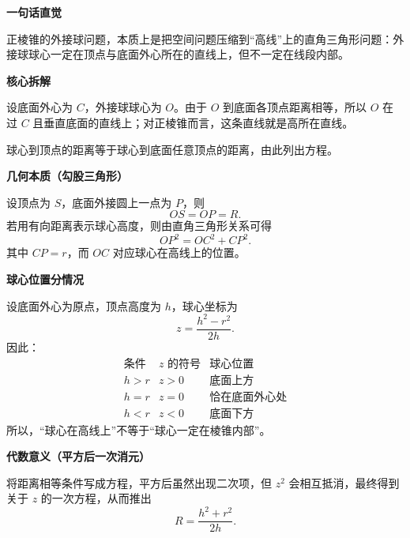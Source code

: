 \begin{explanationbox}

	\textbf{\textcolor{CExplanation}{一句话直觉}}

	正棱锥的外接球问题，本质上是把空间问题压缩到“高线”上的直角三角形问题：外接球球心一定在顶点与底面外心所在的直线上，但不一定在线段内部。

	\medskip
	\textbf{\textcolor{CExplanation}{核心拆解}}
	\begin{description}[style=nextline, leftmargin=2.8em, labelsep=0.5em, itemsep=0.45em]
		\item[\textbf{要点一（球心位置）：}] 设底面外心为 $C$，外接球球心为 $O$。由于 $O$ 到底面各顶点距离相等，所以 $O$ 在过 $C$ 且垂直底面的直线上；对正棱锥而言，这条直线就是高所在直线。
		\item[\textbf{要点二（距离相等）：}] 球心到顶点的距离等于球心到底面任意顶点的距离，由此列出方程。
	\end{description}

	\medskip
	\textbf{\textcolor{CExplanation}{几何本质（勾股三角形）}}

	设顶点为 $S$，底面外接圆上一点为 $P$，则
	\[
		OS=OP=R.
	\]
	若用有向距离表示球心高度，则由直角三角形关系可得
	\[
		OP^2 = OC^2 + CP^2.
	\]
	其中 $CP=r$，而 $OC$ 对应球心在高线上的位置。

	\medskip
	\textbf{\textcolor{CExplanation}{球心位置分情况}}

	设底面外心为原点，顶点高度为 $h$，球心坐标为
	\[
		z=\frac{h^2-r^2}{2h}.
	\]
	因此：
	\[
		\begin{array}{c|c|c}
			\text{条件} & z\text{ 的符号} & \text{球心位置}    \\ \hline
			h>r       & z>0          & \text{底面上方}    \\[3pt]
			h=r       & z=0          & \text{恰在底面外心处} \\[3pt]
			h<r       & z<0          & \text{底面下方}
		\end{array}
	\]
	所以，“球心在高线上”不等于“球心一定在棱锥内部”。

	\medskip
	\textbf{\textcolor{CExplanation}{代数意义（平方后一次消元）}}

	将距离相等条件写成方程，平方后虽然出现二次项，但 $z^2$ 会相互抵消，最终得到关于 $z$ 的一次方程，从而推出
	\[
		R=\frac{h^2+r^2}{2h}.
	\]


\end{explanationbox}
